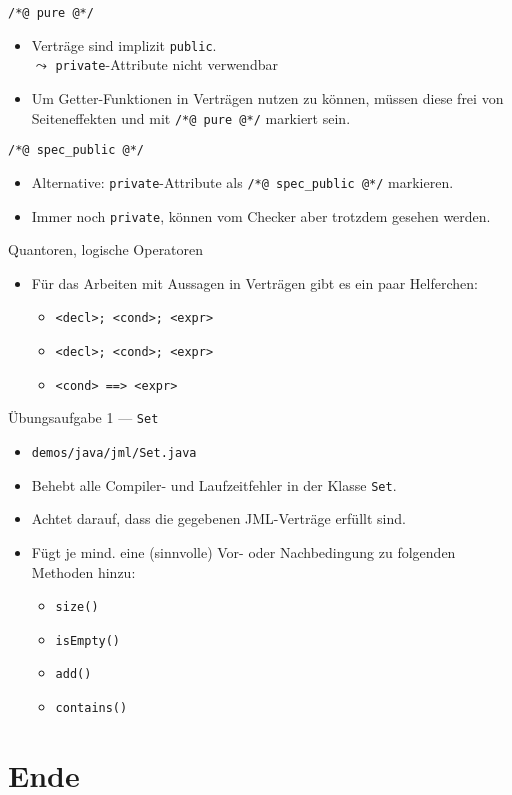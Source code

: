 \documentclass{beamer}
\begin{document}
\begin{frame}{\texttt{/*@ pure @*/}}

	\begin{itemize}
		\item Verträge sind implizit \texttt{public}.\\
		$\leadsto$ \texttt{private}-Attribute nicht verwendbar
		\item Um Getter-Funktionen in Verträgen nutzen zu können, müssen diese frei von Seiteneffekten und mit \texttt{/*@ pure @*/} markiert sein.
	\end{itemize}
\end{frame}

\begin{frame}{\texttt{/*@ spec\_public @*/}}

	\begin{itemize}
		\item Alternative: \texttt{private}-Attribute als \texttt{/*@ spec\_public @*/} markieren.
		\item Immer noch \texttt{private}, können vom Checker aber trotzdem gesehen werden.
	\end{itemize}
\end{frame}

\begin{frame}{Quantoren, logische Operatoren}

	\begin{itemize}
		\item Für das Arbeiten mit Aussagen in Verträgen gibt es ein paar Helferchen:
		\begin{itemize}
			\item \texttt{\string\forall <decl>; <cond>; <expr>}
			\item \texttt{\string\exists <decl>; <cond>; <expr>}
			\item \texttt{<cond> ==> <expr>}
		\end{itemize}
	\end{itemize}
\end{frame}

\begin{frame}{Übungsaufgabe 1 --- \texttt{Set}}
	\begin{itemize}
		\item \texttt{demos/java/jml/Set.java}
		\item Behebt alle Compiler- und Laufzeitfehler in der Klasse \texttt{Set}.
		\pause
		\item Achtet darauf, dass die gegebenen JML-Verträge erfüllt sind.
		\pause
		\item Fügt je mind. eine (sinnvolle) Vor- oder Nachbedingung zu folgenden Methoden hinzu:
		\begin{itemize}
			\item \texttt{size()}
			\item \texttt{isEmpty()}
			\item \texttt{add()}
			\item \texttt{contains()}
		\end{itemize}
	\end{itemize}
\end{frame}

\section{Ende}
\end{document}
